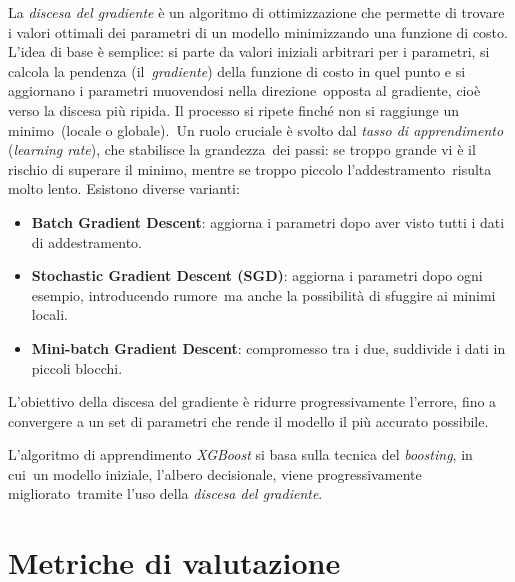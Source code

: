 La \textit{discesa del gradiente} è un algoritmo di ottimizzazione che permette di trovare i valori ottimali dei
parametri di un modello minimizzando una funzione di costo.
L'idea di base è semplice: si parte da valori iniziali arbitrari per i parametri, si calcola la pendenza (il\
\textit{gradiente}) della funzione di costo in quel punto e si aggiornano i parametri muovendosi nella direzione\
opposta al gradiente, cioè verso la discesa più ripida. Il processo si ripete finché non si raggiunge un minimo\
(locale o globale).\
Un ruolo cruciale è svolto dal \textit{tasso di apprendimento} (\textit{learning rate}), che stabilisce la grandezza\
dei passi: se troppo grande vi è il rischio di superare il minimo, mentre se troppo piccolo l'addestramento\
risulta molto lento. Esistono diverse varianti:\
\begin{itemize}
      \item \textbf{Batch Gradient Descent}: aggiorna i parametri dopo aver visto tutti i dati di addestramento.
      \item \textbf{Stochastic Gradient Descent (SGD)}: aggiorna i parametri dopo ogni esempio, introducendo rumore\
            ma anche la possibilità di sfuggire ai minimi locali.
      \item \textbf{Mini-batch Gradient Descent}: compromesso tra i due, suddivide i dati in piccoli blocchi.
\end{itemize}

L'obiettivo della discesa del gradiente è ridurre progressivamente l'errore, fino a convergere a un set di
parametri che rende il modello il più accurato possibile.

L'algoritmo di apprendimento \textit{XGBoost} si basa sulla tecnica del \textit{boosting}, in cui\
un modello iniziale, l'albero decisionale, viene progressivamente migliorato\
tramite l'uso della \textit{discesa del gradiente}.

\section{Metriche di valutazione}

